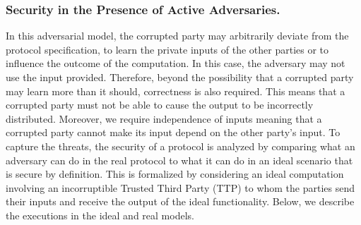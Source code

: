 \vs

 \subsubsection{Security in the Presence of Active Adversaries.}  In this adversarial model, the corrupted party may
arbitrarily deviate from the protocol specification, to learn the private inputs of the other parties or to influence the outcome of the computation. In this case,  the adversary may not use the input provided. Therefore, beyond the possibility that a corrupted party may learn more than it should, correctness is also required. This means that a corrupted party must not be able to cause the output to be incorrectly distributed. Moreover, we require independence of inputs meaning that a corrupted party cannot make its input depend on the other party’s input. To capture the threats,
the security of a protocol is analyzed by comparing what an adversary can do in the real protocol to what it can do in an ideal scenario that is secure by definition. This is formalized by considering an ideal computation involving an incorruptible Trusted Third Party (TTP) to whom the parties send their inputs and receive the output of the ideal functionality. Below, we describe the executions in the ideal and real models. 
 
